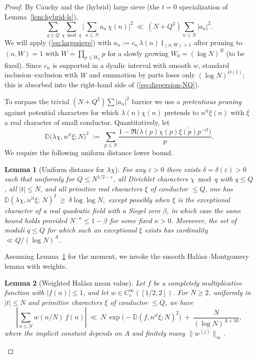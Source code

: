\documentclass[11pt]{article}
\def\eqref#1{(\ref{#1})}%
\newtheorem{lemma}{Lemma}[part]
\theoremstyle{definition}
\theoremstyle{remark}
\numberwithin{equation}{part}
\begin{document}
\begin{proof}
	By Cauchy and the (hybrid) large sieve (the $t=0$ specialization of Lemma~\ref{lem:hybrid-ls}),
	\begin{equation}\label{eq:largesieve}
		\sum_{q\le Q}\sum_{\chi\bmod q}\Big|\sum_{n\le N}a_n\,\chi(n)\Big|^2 \ \ll\ (N+Q^2)\sum_{n\le N}|a_n|^2.
	\end{equation}
	We will apply \eqref{eq:largesieve} with
	\(
	a_n := c_n\,\lambda(n)\,1_{(n,W)=1}
	\)
	after pruning to $(n,W)=1$ with $W=\prod_{p\le W_0}p$ for a slowly growing $W_0=(\log N)^B$ (to be fixed). Since $c_n$ is supported in a dyadic interval with smooth $w$, standard inclusion--exclusion with $W$ and summation by parts loses only $(\log N)^{O(1)}$; this is absorbed into the right-hand side of \eqref{eq:dispersion-NQ}.

	To surpass the trivial $(N+Q^2)\sum|a_n|^2$ barrier we use a \emph{pretentious pruning} against potential characters for which $\lambda(n)\chi(n)$ pretends to $n^{it}\xi(n)$ with $\xi$ a real character of small conductor. Quantitatively, let
	\begin{equation}\label{eq:distance-def}
		\mathbb D\big(\lambda\chi, n^{it}\xi; N\big)^2\ :=\ \sum_{p\le N}\frac{1-\Re\big(\lambda(p)\chi(p)\overline{\xi(p)}p^{-it}\big)}{p}.
	\end{equation}
	We require the following uniform distance lower bound.
	\begin{lemma}[Uniform distance for $\lambda\chi$]\label{lem:distance}
		For any $\varepsilon>0$ there exists $\delta=\delta(\varepsilon)>0$ such that uniformly for $Q\le N^{1/2-\varepsilon}$, all Dirichlet characters $\chi\bmod q$ with $q\le Q$, all $|t|\le N$, and all primitive real characters $\xi$ of conductor $\le Q$, one has
		\(
		\mathbb D\!\left(\lambda\chi, n^{it}\xi;\,N\right)^2 \ \ge\ \delta\log\log N,
		\)
		except possibly when $\xi$ is the exceptional character of a real quadratic field with a Siegel zero $\beta$, in which case the same bound holds provided $N^{-\kappa}\le 1-\beta$ for some fixed $\kappa>0$. Moreover, the set of moduli $q\le Q$ for which such an exceptional $\xi$ exists has cardinality $\ll Q/(\log N)^A$.
	\end{lemma}

	Assuming Lemma~\ref{lem:distance} for the moment, we invoke the smooth Halász--Montgomery lemma with weights.
	\begin{lemma}[Weighted Halász mean value]\label{lem:halasz}
		Let $f$ be a completely multiplicative function with $|f(n)|\le 1$, and let $w\in C_c^\infty([1/2,2])$. For $N\ge2$, uniformly in $|t|\le N$ and primitive characters $\xi$ of conductor $\le Q$, we have
		\[
			\left|\sum_{n\le N} w(n/N)\,f(n)\right| \ \ll\ N\,\exp\!\big(-\mathbb D(f,n^{it}\xi;N)^2\big)\ +\ \frac{N}{(\log N)^{A+10}},
		\]
		where the implicit constant depends on $A$ and finitely many $\|w^{(j)}\|_\infty$.
	\end{lemma}


\end{proof}
\end{document}
